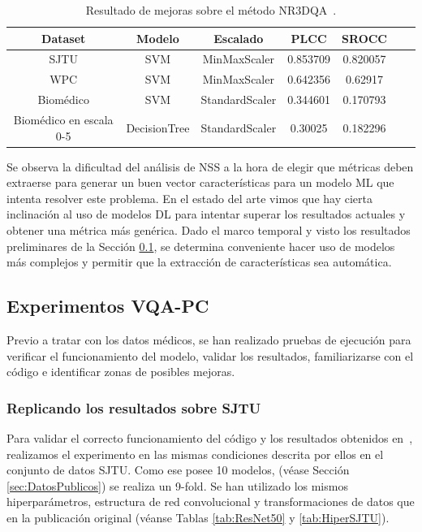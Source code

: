 \begin{table}[htp]
  \scriptsize
  \begin{center}
    \begin{tabular}[c]{|c|c|c|c|c|c|c|}
      \hline
      \rowcolor[HTML]{FFC702}
      \textbf{Dataset} & \textbf{Modelo} & \textbf{Escalado} & \textbf{PLCC} & \textbf{SROCC} \\ 
      \hline
      SJTU & SVM & MinMaxScaler & 0.853709 & 0.820057 \\ 
      \hline 
      WPC & SVM & MinMaxScaler & 0.642356 & 0.62917 \\
      \hline 
      Biomédico & SVM & StandardScaler & 0.344601 &  0.170793 \\
      \hline
      Biomédico en escala 0-5 & DecisionTree & StandardScaler & 0.30025  & 0.182296 \\
      \hline
    \end{tabular}
  \end{center}
  \caption[Resultado de mejoras sobre el método NR3DQA.]{
    Resultado de mejoras sobre el método NR3DQA~\cite{NR3DQA}.
  }
  \label{tab:ImprovNR3DQA}
\end{table}

Se observa la dificultad del análisis de NSS a la hora de elegir que métricas 
deben extraerse para generar un buen vector características para un modelo ML 
que intenta resolver este problema. 
En el estado del arte vimos que hay cierta inclinación al uso de modelos 
DL para intentar superar los resultados actuales y obtener una métrica más 
genérica. 
Dado el marco temporal y visto los 
resultados preliminares de la Sección \ref{sec:PreResults}, se determina 
conveniente hacer uso de modelos más complejos y permitir que la extracción 
de características sea automática. 

\subsection{Experimentos VQA-PC}
\label{sec:PreResults}
Previo a tratar con los datos médicos, se han realizado pruebas de ejecución 
para verificar el funcionamiento del modelo, validar los resultados, familiarizarse 
con el código e identificar zonas de posibles mejoras.

\subsubsection{Replicando los resultados sobre SJTU}
\label{sec:VQAPCSJTU}
Para validar el correcto funcionamiento del código y los resultados obtenidos 
en~\cite{VQA-PC}, realizamos el experimento en las mismas condiciones descrita 
por ellos en el conjunto de datos SJTU. Como ese posee 10 modelos, 
(véase Sección \ref{sec:DatosPublicos}) se realiza un 9-fold. Se han utilizado 
los mismos hiperparámetros, estructura de red convolucional y transformaciones 
de datos que en la publicación original (véanse Tablas \ref{tab:ResNet50} y \ref{tab:HiperSJTU}). 

